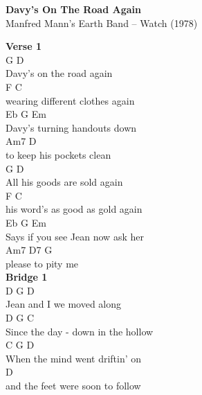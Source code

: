 \documentclass[a4paper]{article}
\begin{document}
    \begin{center}
        \textbf{Davy's On The Road Again}
        ~\\
        Manfred Mann's Earth Band -- Watch (1978)
    \end{center}
    {
        \scriptsize
        \textbf{Verse 1}
        ~\\
        {
            \cutive
            \obeyspaces
G             D
\\
Davy's on the road again
\\
F                 C
\\
wearing different clothes again
\\
Eb             G        Em
\\
Davy's turning handouts down
\\
Am7                 D
\\
to keep his pockets clean
\\
G                 D
\\
All his goods are sold again
\\
F                     C
\\
his word's as good as gold again
\\
Eb              G        Em
\\
Says if you see Jean now ask her
\\
Am7       D7   G
\\
please to pity me
\\

        }
        \textbf{Bridge 1}
        ~\\
        {
            \cutive
            \obeyspaces
D                         G  D
\\
Jean and I we moved along
\\
D                           G       C
\\
Since the day - down in the hollow
\\
C                              G  D
\\
When the mind went driftin' on
\\
D
\\
and the feet were soon to follow
\\

}}
\end{document}
